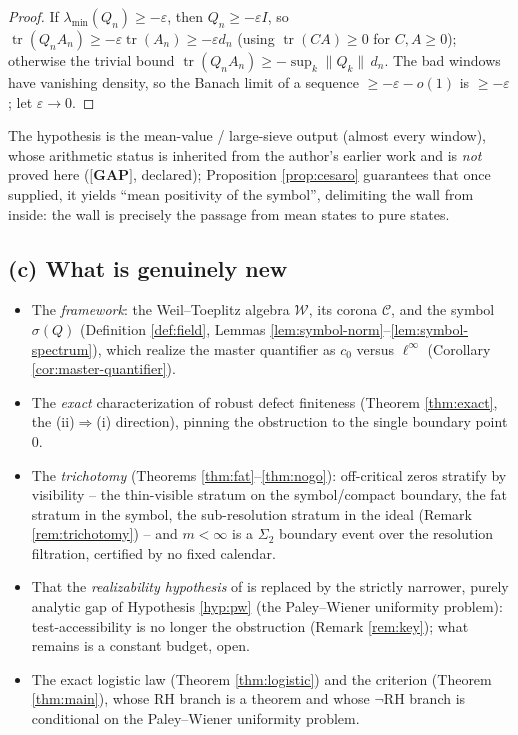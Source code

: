 \documentclass[11pt,reqno]{amsart}
\theoremstyle{definition}
\newcommand{\W}{\mathcal{W}}
\newcommand{\Cor}{\mathcal{C}}
\newcommand{\tr}{\operatorname{tr}}
\newcommand{\GAP}{\textbf{[GAP]}}
\begin{document}
\begin{proof}
If \(\lambda_{\min}(Q_n)\geq-\varepsilon\), then \(Q_n\geq-\varepsilon I\), so
\(\tr(Q_nA_n)\geq-\varepsilon\tr(A_n)\geq-\varepsilon d_n\) (using
\(\tr(CA)\geq0\) for \(C,A\geq0\)); otherwise the trivial bound
\(\tr(Q_nA_n)\geq-\sup_k\|Q_k\|\,d_n\). The bad windows have vanishing density,
so the Banach limit of a sequence \(\geq-\varepsilon-o(1)\) is
\(\geq-\varepsilon\); let \(\varepsilon\to0\).
\end{proof}

The hypothesis is the mean-value / large-sieve output (almost every window),
whose arithmetic status is inherited from the author's earlier work and is
\emph{not} proved here (\(\GAP\), declared); Proposition \ref{prop:cesaro}
guarantees that once supplied, it yields ``mean positivity of the symbol'',
delimiting the wall from inside: the wall is precisely the passage from mean
states to pure states.

\subsection{(c) What is genuinely new}
\begin{itemize}
\item The \emph{framework}: the Weil--Toeplitz algebra \(\W\), its corona
\(\Cor\), and the symbol \(\sigma(Q)\) (Definition \ref{def:field}, Lemmas
\ref{lem:symbol-norm}--\ref{lem:symbol-spectrum}), which realize the master
quantifier as \(c_0\) versus \(\ell^\infty\) (Corollary
\ref{cor:master-quantifier}).
\item The \emph{exact} characterization of robust defect finiteness (Theorem
\ref{thm:exact}, the (ii)\(\Rightarrow\)(i) direction), pinning the obstruction
to the single boundary point \(0\).
\item The \emph{trichotomy} (Theorems \ref{thm:fat}--\ref{thm:nogo}): off-critical
zeros stratify by visibility -- the thin-visible stratum on the symbol/compact
boundary, the fat stratum in the symbol, the sub-resolution stratum in the
ideal (Remark \ref{rem:trichotomy}) -- and \(m<\infty\) is a \(\Sigma_2\)
boundary event over the resolution filtration, certified by no fixed calendar.
\item That the \emph{realizability hypothesis} of \cite{P40} is replaced by the
strictly narrower, purely analytic gap of Hypothesis \ref{hyp:pw}
(the Paley--Wiener uniformity problem): test-accessibility is no longer the obstruction (Remark
\ref{rem:key}); what remains is a constant budget, open.
\item The exact logistic law (Theorem \ref{thm:logistic}) and the criterion
(Theorem \ref{thm:main}), whose RH branch is a theorem and whose \(\neg\)RH
branch is conditional on the Paley--Wiener uniformity problem.
\end{itemize}
\end{document}
